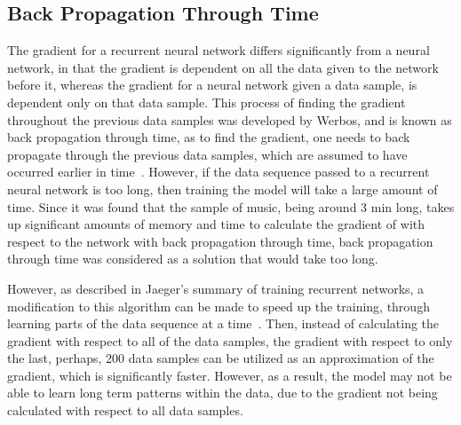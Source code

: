 \documentclass[12pt]{article}
\begin{document}
\subsection{Back Propagation Through Time}
The gradient for a recurrent neural network differs significantly from a neural
network, in that the gradient is dependent on all the data given to the network
before it, whereas the gradient for a neural network given a data sample, is
dependent only on that data sample. This process of finding the gradient
throughout the previous data samples was developed by Werbos, and is known as
back propagation through time, as to find the gradient, one needs to back
propagate through the previous data samples, which are assumed to have occurred
earlier in time~\cite{bptt}. However, if the data sequence passed to a recurrent
neural network is too long, then training the model will take a large amount of
time. Since it was found that the sample of music, being around 3 min long,
takes up significant amounts of memory and time to calculate the
gradient of with respect to the network with back propagation through time,
back propagation through time was considered as a solution that would take too
long.

However, as described in Jaeger's summary of training recurrent networks, a
modification to this algorithm can be made to speed up the training, through
learning parts of the data sequence at a time~\cite{rnntrain}. Then, instead of
calculating the gradient with respect to all of the data samples, the gradient
with respect to only the last, perhaps, 200 data samples can be utilized as an
approximation of the gradient, which is significantly faster. However, as a
result, the model may not be able to learn long term patterns within the data,
due to the gradient not being calculated with respect to all data samples.


\end{document}
